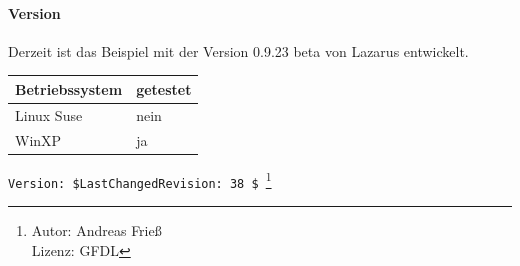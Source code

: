 \paragraph{Version}
Derzeit ist das Beispiel mit der Version 0.9.23 beta von Lazarus entwickelt.
\begin{table}[htbp]
		\begin{tabular}[ht]{|l|l|}
      \hline
      Betriebssystem & getestet \\
      \hline
      Linux Suse & nein \\
      WinXP & ja \\
      \hline
		\end{tabular}
\end{table}
\caption{Versionsübersicht}
\label{tab:MySQLSimpleVersion01} 

\verb|Version: $LastChangedRevision: 38 $ |\footnote{ Autor: Andreas Frieß\\Lizenz: GFDL}